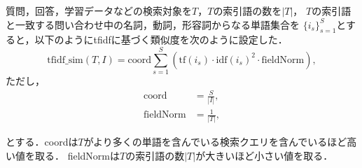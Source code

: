 \documentclass[japanese]{jnlp_1.4}
\begin{document}
質問，回答，学習データなどの検索対象を$T$，$T$の索引語の数を$|T|$，
$T$の索引語と一致する問い合わせ中の名詞，動詞，形容詞からなる単語集合を
$\{i_s\}_{s=1}^{S}$とすると，以下のようにtfidfに基づく類似度を次のように設定した．
\begin{equation}
  \textrm{tfidf\_sim}(T, I) = \textrm{coord} \sum_{s=1}^S(\textrm{tf}(i_s) \cdot \textrm{idf}(i_s)^2 \cdot \textrm{fieldNorm}), \nonumber
\end{equation}
ただし，
\begin{align*}
  \textrm{coord} &= \frac{S}{|I|}, \\
  \textrm{fieldNorm} &= \frac{1}{|T|},
\end{align*}

とする．coordは$T$がより多くの単語を含んでいる検索クエリを含んでいるほど高い値を取る．
fieldNormは$T$の索引語の数$|T|$が大きいほど小さい値を取る．


\begin{biography}

\end{biography}


\biodate
\end{document}
